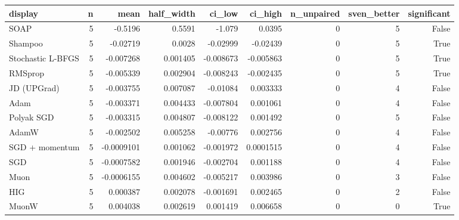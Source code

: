 \begin{tabular}{lrrrrrrrr}
\toprule
display & n & mean & half\_width & ci\_low & ci\_high & n\_unpaired & sven\_better & significant \\
\midrule
SOAP & 5 & -0.5196 & 0.5591 & -1.079 & 0.0395 & 0 & 5 & False \\
Shampoo & 5 & -0.02719 & 0.0028 & -0.02999 & -0.02439 & 0 & 5 & True \\
Stochastic L-BFGS & 5 & -0.007268 & 0.001405 & -0.008673 & -0.005863 & 0 & 5 & True \\
RMSprop & 5 & -0.005339 & 0.002904 & -0.008243 & -0.002435 & 0 & 5 & True \\
JD (UPGrad) & 5 & -0.003755 & 0.007087 & -0.01084 & 0.003333 & 0 & 4 & False \\
Adam & 5 & -0.003371 & 0.004433 & -0.007804 & 0.001061 & 0 & 4 & False \\
Polyak SGD & 5 & -0.003315 & 0.004807 & -0.008122 & 0.001492 & 0 & 5 & False \\
AdamW & 5 & -0.002502 & 0.005258 & -0.00776 & 0.002756 & 0 & 4 & False \\
SGD + momentum & 5 & -0.0009101 & 0.001062 & -0.001972 & 0.0001515 & 0 & 4 & False \\
SGD & 5 & -0.0007582 & 0.001946 & -0.002704 & 0.001188 & 0 & 4 & False \\
Muon & 5 & -0.0006155 & 0.004602 & -0.005217 & 0.003986 & 0 & 3 & False \\
HIG & 5 & 0.000387 & 0.002078 & -0.001691 & 0.002465 & 0 & 2 & False \\
MuonW & 5 & 0.004038 & 0.002619 & 0.001419 & 0.006658 & 0 & 0 & True \\
\bottomrule
\end{tabular}
